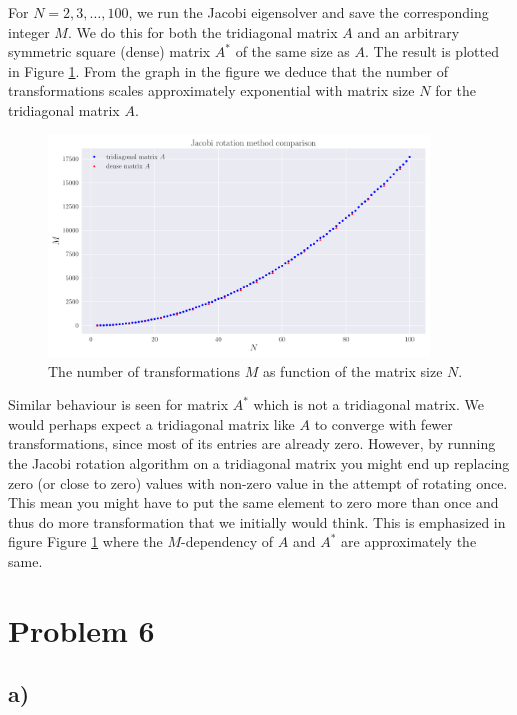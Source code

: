\documentclass[english,notitlepage,nofootinbib]{revtex4-1}  %
\begin{document}
For $N=2,3,\dots,100$, we run the Jacobi eigensolver and save the corresponding integer $M$. We do this for both the tridiagonal matrix $A$ and an arbitrary symmetric square (dense) matrix $A^*$ of the same size as $A$. The result is plotted in Figure \ref{fig:p5_transformations_per_N}. From the graph in the figure we deduce that the number of transformations scales approximately exponential with matrix size $N$ for the tridiagonal matrix $A$. 


\begin{figure}[h!]
    \centering
    \includegraphics[width=0.9\textwidth]{jacobi_comparison.pdf}
    \caption{The number of transformations $M$ as function of the matrix size $N$.}\label{fig:p5_transformations_per_N}
\end{figure}

Similar behaviour is seen for matrix $A^*$ which is not a tridiagonal matrix. We would perhaps expect a tridiagonal matrix like $A$ to converge with fewer transformations, since most of its entries are already zero. However, by running the Jacobi rotation algorithm on a tridiagonal matrix you might end up replacing zero (or close to zero) values with non-zero value in the attempt of rotating once. This mean you might have to put the same element to zero more than once and thus do more transformation that we initially would think. This is emphasized in figure Figure \ref{fig:p5_transformations_per_N} where the $M$-dependency of $A$ and $A^*$ are approximately the same.   


\section*{Problem 6}

\subsection*{a)}
\end{document}
